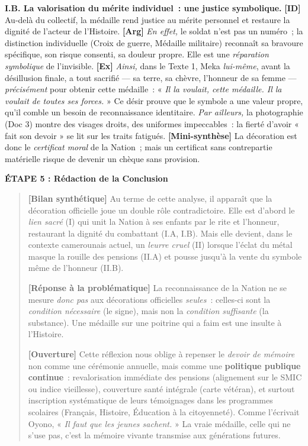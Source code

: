 \documentclass[11pt]{article}
\begin{document}
\begin{exoresolu}
\noindent \textbf{I.B. La valorisation du mérite individuel~: une justice symbolique.}
\noindent \textbf{[ID]} Au-delà du collectif, la médaille rend justice au mérite personnel et restaure la dignité de l'acteur de l'Histoire. \textbf{[Arg]} \emph{En effet,} le soldat n'est pas un numéro~; la distinction individuelle (Croix de guerre, Médaille militaire) reconnaît sa bravoure spécifique, son risque consenti, sa douleur propre. Elle est une \emph{réparation symbolique} de l'invisible. \textbf{[Ex]} \emph{Ainsi,} dans le Texte 1, Meka \emph{lui-même}, avant la désillusion finale, a tout sacrifié — sa terre, sa chèvre, l'honneur de sa femme — \emph{précisément} pour obtenir cette médaille~: « \emph{Il la voulait, cette médaille. Il la voulait de toutes ses forces.} » Ce désir prouve que le symbole a une valeur propre, qu'il comble un besoin de reconnaissance identitaire. \emph{Par ailleurs,} la photographie (Doc 3) montre des visages droits, des uniformes impeccables~: la fierté d'avoir « fait son devoir » se lit sur les traits fatigués. \textbf{[Mini-synthèse]} La décoration est donc le \emph{certificat moral} de la Nation~; mais un certificat sans contrepartie matérielle risque de devenir un chèque sans provision.

\textbf{ÉTAPE 5 : Rédaction de la Conclusion}

\begin{quote}
\textbf{[Bilan synthétique]} Au terme de cette analyse, il apparaît que la décoration officielle joue un double rôle contradictoire. Elle est d'abord le \emph{lien sacré} (I) qui unit la Nation à ses enfants par le rite et l'honneur, restaurant la dignité du combattant (I.A, I.B). Mais elle devient, dans le contexte camerounais actuel, un \emph{leurre cruel} (II) lorsque l'éclat du métal masque la rouille des pensions (II.A) et pousse jusqu'à la vente du symbole même de l'honneur (II.B).

\textbf{[Réponse à la problématique]} La reconnaissance de la Nation ne se mesure \emph{donc pas} aux décorations officielles \emph{seules}~: celles-ci sont la \emph{condition nécessaire} (le signe), mais non la \emph{condition suffisante} (la substance). Une médaille sur une poitrine qui a faim est une insulte à l'Histoire.

\textbf{[Ouverture]} Cette réflexion nous oblige à repenser le \emph{devoir de mémoire} non comme une cérémonie annuelle, mais comme une \textbf{politique publique continue}~: revalorisation immédiate des pensions (alignement sur le SMIC ou indice vieillesse), couverture santé intégrale (carte vétéran), et surtout inscription systématique de leurs témoignages dans les programmes scolaires (Français, Histoire, Éducation à la citoyenneté). Comme l'écrivait Oyono, « \emph{Il faut que les jeunes sachent.} » La vraie médaille, celle qui ne s'use pas, c'est la mémoire vivante transmise aux générations futures.
\end{quote}


\end{exoresolu}
\end{document}
